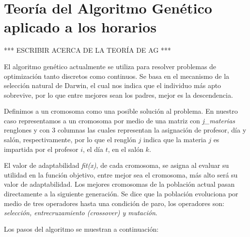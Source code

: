 \chapter{Teoría del Algoritmo Genético aplicado a los horarios}

*** ESCRIBIR ACERCA DE LA TEORÍA DE AG ***

El algoritmo genético actualmente se utiliza para resolver problemas de optimización tanto discretos como continuos. Se basa en el mecanismo de la selección natural de Darwin, el cual nos indica que el individuo más apto sobrevive, por lo que entre mejores sean los padres, mejor es la descendencia.

Definimos a un cromosoma como una posible solución al problema. En nuestro caso representamos a un cromosoma por medio de una matriz con \textit{j\_materias} renglones y con 3 columnas las cuales representan la asignación de profesor, día y salón, respectivamente, por lo que el renglón $j$ indica que la materia $j$ es impartida por el profesor $i$, el día $t$, en el salón $k$.

El valor de adaptabilidad \textit{fit(x)}, de cada cromosoma, se asigna al evaluar su utilidad en la función objetivo, entre mejor sea el cromosoma, más alto será su valor de adaptabilidad. Los mejores cromosomas de la población actual pasan directamente a la siguiente generación. Se dice que la población evoluciona por medio de tres operadores hasta una condición de paro, los operadores son: \textit{selección, entrecruzamiento \textit{(crossover)} y mutación}.

Los pasos del algoritmo se muestran a continuación:



